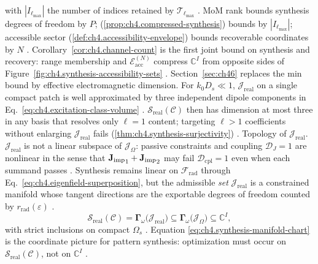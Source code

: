 with \(|I_{\ell_{\max}}|\) the number of indices retained by \(\mathcal{T}_{\ell_{\max}}\)
\cite{hansen1988}.
MoM rank bounds synthesis degrees of freedom by \(P\); (\ref{prop:ch4.compressed-synthesis}) bounds by
\(|I_{\ell_{\max}}|\); accessible sector (\ref{def:ch4.accessibility-envelope}) bounds recoverable
coordinates by \(N\) \cite{stratton1941}.
Corollary~\ref{cor:ch4.channel-count} is the first joint bound on synthesis and recovery: range membership and
$\mathcal{E}_{\mathrm{acc}}^{(N)}$ compress \(\mathbb{C}^{I}\) from opposite sides of Figure~\ref{fig:ch4.synthesis-accessibility-sets}
\cite{devaney2004}. Section~\ref{sec:ch46} replaces the min bound by effective electromagnetic dimension.
For \(k_{0}D_{s}\ll1\), \(\mathcal{J}_{\mathrm{real}}\) on a single compact patch is well approximated by
three independent dipole components in Eq.~\eqref{eq:ch4.excitation-class-volume}
\cite{jackson1999}. \(\mathcal{S}_{\mathrm{real}}(\mathcal{C})\) then has dimension at most
three in any basis that resolves only \(\ell=1\) content; targeting \(\ell>1\) coefficients without enlarging
\(\mathcal{J}_{\mathrm{real}}\) fails (\ref{thm:ch4.synthesis-surjectivity})
\cite{hansen1988}.
Topology of \(\mathcal{J}_{\mathrm{real}}\). \(\mathcal{J}_{\mathrm{real}}\) is not a linear subspace of \(\mathcal{J}_\Omega\): passive constraints and
coupling $\mathcal{D}_J=1$ are nonlinear in the sense that \({\mathbf{J}_{\mathrm{imp}}}_{1}+{\mathbf{J}_{\mathrm{imp}}}_{2}\) may fail
\(\mathcal{D}_{\mathrm{cpl}}=1\) even when each summand passes \cite{harrington2001}. Synthesis remains
linear on \(\mathcal{F}_{\mathrm{rad}}\) through Eq.~\eqref{eq:ch4.eigenfield-superposition}, but the admissible
\emph{set} \(\mathcal{J}_{\mathrm{real}}\) is a constrained manifold whose tangent directions are the exportable
degrees of freedom counted by \(r_{\mathrm{rad}}(\varepsilon)\) \cite{devaney2004}.
\begin{equation}
\label{eq:ch4.synthesis-manifold-chart}
\mathcal{S}_{\mathrm{real}}(\mathcal{C})
=
\boldsymbol{\Gamma}_\omega\big(\mathcal{J}_{\mathrm{real}}\big)
\subseteq
\boldsymbol{\Gamma}_\omega\big(\mathcal{J}_\Omega\big)
\subseteq
\mathbb{C}^{I},
\end{equation}
with strict inclusions on compact \(\Omega_{s}\) \cite{stratton1941}. Equation
\eqref{eq:ch4.synthesis-manifold-chart} is the coordinate picture for pattern synthesis: optimization must occur on
\(\mathcal{S}_{\mathrm{real}}(\mathcal{C})\), not on \(\mathbb{C}^{I}\) \cite{devaney2004}.
